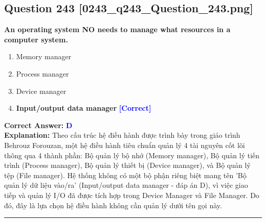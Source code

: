 \documentclass[11pt,a4paper]{article}
\begin{document}
\begin{minipage}{\textwidth}
\subsection*{Question 243 \quad \footnotesize{[0243\_q243\_Question\_243.png]}}
\noindent \textbf{An operating system NO needs to manage what resources in a computer system.}

\begin{enumerate}[label=\Alph*.]
    \item Memory manager
    \item Process manager
    \item Device manager
    \item \textbf{Input/output data manager} \hfill \textcolor{blue}{\textbf{[Correct]}}
\end{enumerate}

\noindent \textbf{Correct Answer:} \textcolor{blue}{\textbf{D}} \\[2pt]
\noindent \textbf{Explanation:} Theo cấu trúc hệ điều hành được trình bày trong giáo trình Behrouz Forouzan, một hệ điều hành tiêu chuẩn quản lý 4 tài nguyên cốt lõi thông qua 4 thành phần: Bộ quản lý bộ nhớ (Memory manager), Bộ quản lý tiến trình (Process manager), Bộ quản lý thiết bị (Device manager), và Bộ quản lý tệp (File manager). Hệ thống không có một bộ phận riêng biệt mang tên 'Bộ quản lý dữ liệu vào/ra' (Input/output data manager - đáp án D), vì việc giao tiếp và quản lý I/O đã được tích hợp trong Device Manager và File Manager. Do đó, đây là lựa chọn hệ điều hành không cần quản lý dưới tên gọi này.

\par\vspace{0.3cm}
\hrule
\vspace{0.3cm}
\end{minipage}
\end{document}
